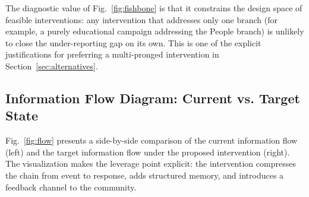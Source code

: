 \documentclass[conference]{IEEEtran}
\begin{document}
The diagnostic value of Fig.~\ref{fig:fishbone} is that it constrains
the design space of feasible interventions: any intervention that
addresses only one branch (for example, a purely educational campaign
addressing the People branch) is unlikely to close the under-reporting
gap on its own. This is one of the explicit justifications for
preferring a multi-pronged intervention in
Section~\ref{sec:alternatives}.

\subsection{Information Flow Diagram: Current vs. Target State}
\label{sec:flowdiagram}
Fig.~\ref{fig:flow} presents a side-by-side comparison of the current
information flow (left) and the target information flow under the
proposed intervention (right). The visualization makes the leverage
point explicit: the intervention compresses the chain from event to
response, adds structured memory, and introduces a feedback channel
to the community.
\end{document}
